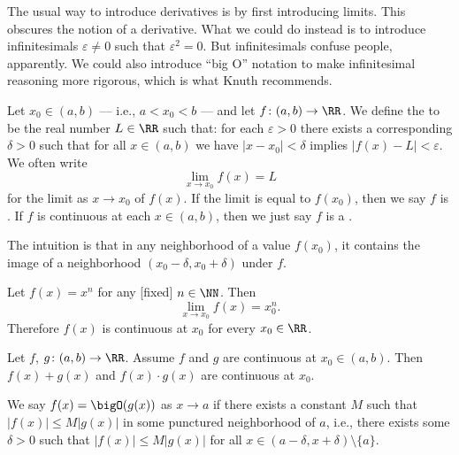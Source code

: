\begin{node}\label{calculus-0005}%
\begin{node}\label{calculus-0002}%
The usual way to introduce derivatives is by first introducing
limits. This obscures the notion of a derivative. What we could do
instead is to introduce infinitesimals $\varepsilon\neq0$ such that
$\varepsilon^{2}=0$. But infinitesimals confuse people, apparently.
We could also introduce ``big O'' notation to make infinitesimal
reasoning more rigorous, which is what Knuth recommends.
\end{node}

\begin{definition}\label{calculus-0018}%
Let $x_{0}\in(a,b)$ --- i.e., $a<x_{0}<b$ --- and let
$f\colon(a,b)\to\RR$. We define the 
to be the real number $L\in\RR$ such that: for each $\varepsilon>0$
there exists a corresponding $\delta>0$ such that for all $x\in(a,b)$ we
have $|x-x_{0}|<\delta$ implies $|f(x)-L|<\varepsilon$. We often write
\[\lim_{x\to x_{0}}f(x)=L\]
for the limit as $x\to x_{0}$ of $f(x)$. If the limit is equal to
$f(x_{0})$, then we say $f$ is . If $f$ is
continuous at each $x\in(a,b)$, then we just say $f$ is a
.

The intuition is that in any neighborhood of a value $f(x_{0})$, it
contains the image of a neighborhood $(x_{0}-\delta,x_{0}+\delta)$ under
$f$. 

\begin{example}\label{calculus-0019}%
Let $f(x)=x^{n}$ for any [fixed] $n\in\NN$. Then
\[\lim_{x\to x_{0}}f(x)=x_{0}^{n}.\]
Therefore $f(x)$ is continuous at $x_{0}$ for every $x_{0}\in\RR$.
\end{example}

\begin{theorem}
Let $f$, $g\colon(a,b)\to\RR$. Assume $f$ and $g$ are continuous at
$x_{0}\in(a,b)$. Then $f(x)+g(x)$ and $f(x)\cdot g(x)$ are continuous at
$x_{0}$.
\end{theorem}
\end{definition}

\begin{definition}\label{calculus-0001}%
We say $f(x)=\bigO(g(x))$ as $x\to a$ if there exists a constant $M$
such that $|f(x)|\leq M|g(x)|$ in some punctured neighborhood of $a$,
i.e., there exists some $\delta>0$ such that $|f(x)|\leq M|g(x)|$ for all $x\in(a-\delta,x+\delta)\setminus\{a\}$.


\end{definition}
\end{node}
